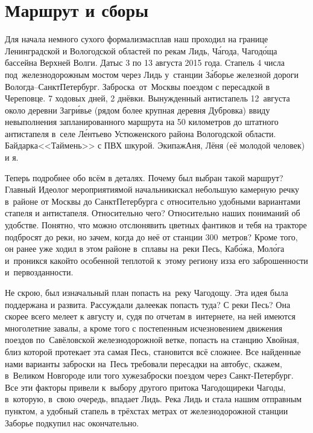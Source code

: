 \chapter{Маршрут и сборы}

Для начала немного сухого формализма\mdash сплав наш проходил на границе Ленинградской и Вологодской областей по рекам Лидь, Ч\'{а}года, Чагод\'{о}ща бассейна Верхней Волги. Даты\mdash с 3 по 13 августа 2015 года. Стапель 4 числа под~железнодорожным мостом через Лидь у~станции З\'{а}борье железной дороги Вологда\nobreakdash--Санкт\sdash Петербург. Заброска~от~Москвы поездом с пересадкой в Череповце. 7 ходовых дней, 2 днёвки. Вынужденный антистапель 12~августа около деревни Загр\'{и}вье (рядом более крупная деревня Дубровка) ввиду невыполнения запланированного маршрута на 50 километров до штатного антистапеля в~селе Л\'{е}нтьево Устюженского района Вологодской области.  Байдарка\mdash <<Таймень>> с ПВХ шкурой. Экипаж\mdash Аня, Лёня (её молодой человек) и я.

Теперь подробнее обо всём в деталях. Почему был выбран такой маршрут? Главный Идеолог мероприятия\mdash мой начальник\mdash искал небольшую камерную речку в~районе от Москвы до Санкт\sdash Петербурга с относительно удобными вариантами стапеля и антистапеля. Относительно чего? Относительно наших пониманий об удобстве. Понятно, что можно отслюнявить цветных фантиков и тебя на тракторе подбросят до реки, но зачем, когда до неё от станции 300~метров? Кроме того, он ранее уже ходил в этом районе в~сплавы на~реки Песь, Каб\'{о}жа, Мол\'{о}га и~проникся какой\sdash то особенной теплотой к~этому региону из\sdash за его заброшенности и~первозданности.

Не скрою, был изначальный план попасть на~реку Чагодощу. Эта идея была поддержана и развита. Рассуждали далее\mdash как попасть туда? С реки Песь? Она скорее всего мелеет к августу и, судя по отчетам в~интернете, на ней имеются многолетние завалы, а кроме того с постепенным исчезновением движения поездов по~Савёловской железнодорожной ветке, попасть на станцию Хвойная, близ которой протекает эта самая Песь, становится всё сложнее. Все найденные нами варианты заброски на~Песь требовали пересадки на автобус, скажем, в~Великом Новгороде или того хуже\mdash заброски поездом через Санкт-Петербург. Все эти факторы привели к~выбору другого притока Чагодощи\mdash реки Чагоды, в~которую, в~свою очередь, впадает Лидь. Река Лидь и стала нашим отправным пунктом, а удобный стапель в трёхстах метрах от железнодорожной станции Заборье подкупил нас окончательно. 

